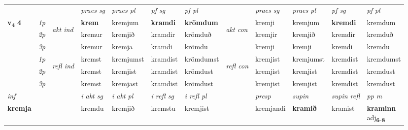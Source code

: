 \begin{longtable}[l]{X>{\footnotesize\itshape}llXXXXlXXXX}
 & &   & \textit{praes sg}  & \textit{praes pl}    & \textit{ pf sg} & \textit{pf pl} & & \textit{praes sg}  & \textit{praes pl}    & \textit{pf sg} & \textit{pf pl }  \\ \cmidrule{4-7} \cmidrule{9-12}
 \multirow{2}{*}{{{\textbf{v{\textsubscript{4}}} \Large{\textbf{4}}}}}  & 1p & \multirow{3}{*}{\begin{turn}{90}\textit{akt ind}\end{turn}} & \textbf{krem} & kremjum & \textbf{kramdi} & \textbf{krömdum} & \multirow{3}{*}{\begin{turn}{90}\textit{akt con}\end{turn}} &kremji & kremjum & \textbf{kremdi} & kremdum\\*
 & 2p &  &  kremur  & kremjið & kramdir & krömduð & & kremjir & kremjið & kremdir & kremduð \\*
 & 3p &  & kremur & kremja & kramdi & krömdu & & kremji & kremji& kremdi & kremdu \\*
\cmidrule{4-7} \cmidrule{9-12}
 & 1p & \multirow{3}{*}{\begin{turn}{90}\textit{refl ind}\end{turn}}  & kremst & kremjumst & kramdist & krömdumst & \multirow{3}{*}{\begin{turn}{90}\textit{refl con}\end{turn}}  &kremjist & kremjumst & kremdist & kremdumst \\*
 & 2p &  & kremst & kremjist & kramdist & krömdust & &kremjist & kremjist & kremdist & kremdust \\*
 & 3p  & & kremst & kremjast & kramdist & krömdust & & kremjist & kremjist& kremdist & kremdust \\*
\cmidrule{4-7} \cmidrule{9-12}

   {\textit{inf}} & &  & \textit{i akt sg} & \textit{i akt pl} & \textit{i refl sg} & \textit{i refl pl} && \textit{presp} & \textit{supin} & \textit{supin refl} & \textit{pp m} \\*
  {\textbf{kremja}} & && kremdu  & kremjið & kremstu & kremjist && kremjandi &  \textbf{kramið} & kramist & \specialcell{\textbf{kraminn} \\ adj\textbf{\textsubscript{6-8}}} \\*


\end{longtable}
